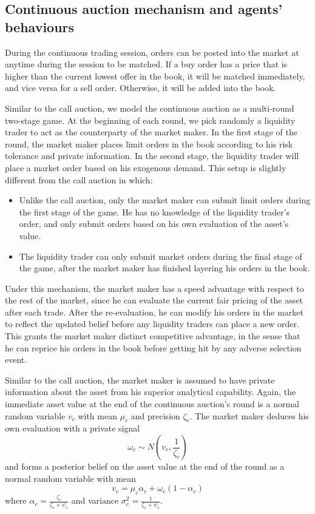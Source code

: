 \subsection{Continuous auction mechanism and agents' behaviours}\label{subsec:AnalyticalFrameworkContinuousAuction}

During the continuous trading session, orders can be posted into the market at anytime during the session to be matched. If a buy order has a price that is higher than the current lowest offer in the book, it will be matched immediately, and vice versa for a sell order. Otherwise, it will be added into the book.

Similar to the call auction, we model the continuous auction as a multi-round two-stage game. At the beginning of each round, we pick randomly a liquidity trader to act as the counterparty of the market maker. In the first stage of the round, the market maker places limit orders in the book according to his risk tolerance and private information. In the second stage, the liquidity trader will place a market order based on his exogenous demand. This setup is slightly different from the call auction in which:
\begin{itemize}
  \item Unlike the call auction, only the market maker can submit limit orders during the first stage of the game. He has no knowledge of the liquidity trader's order, and only submit orders based on his own evaluation of the asset's value.
  \item The liquidity trader can only submit market orders during the final stage of the game, after the market maker has finished layering his orders in the book.
\end{itemize}
Under this mechanism, the market maker has a speed advantage with respect to the rest of the market, since he can evaluate the current fair pricing of the asset after each trade. After the re-evaluation, he can modify his orders in the market to reflect the updated belief before any liquidity traders can place a new order. This grants the market maker distinct competitive advantage, in the sense that he can reprice his orders in the book before getting hit by any adverse selection event.

Similar to the call auction, the market maker is assumed to have private information about the asset from his superior analytical capability. Again, the immediate asset value at the end of the continuous auction's round is a normal random variable $v_c$ with mean $\mu_c$ and precision $\zeta_c$. The market maker deduces his own evaluation with a private signal
\[
  \omega_c \sim N(v_c, \frac{1}{\zeta_c})
\]
and forms a posterior belief on the asset value at the end of the round as a normal random variable with mean
\[
  v_c=\mu_c \alpha_c + \omega_c(1 - \alpha_c)
\]
where $\alpha_c = \frac{\zeta_c}{\zeta_c+\psi_c}$ and variance $\sigma_c^2=\frac{1}{\zeta_c+\psi_c}$.

